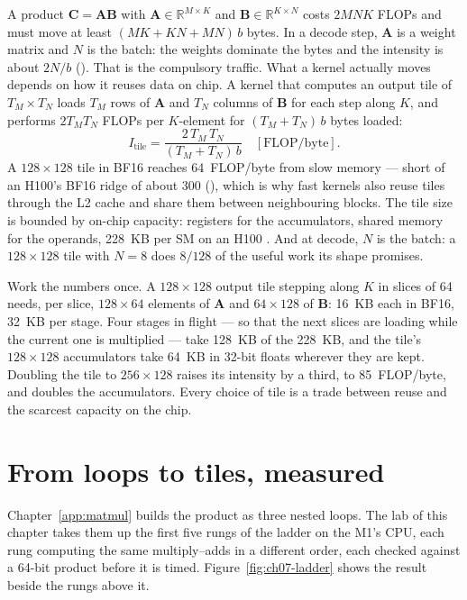 A product $\mathbf{C}=\mathbf{A}\mathbf{B}$ with
$\mathbf{A}\in\mathbb{R}^{M\times K}$ and $\mathbf{B}\in\mathbb{R}^{K\times N}$
costs $2MNK$ FLOPs and must move at least $(MK+KN+MN)\,b$ bytes. In a decode
step, $\mathbf{A}$ is a weight matrix and $N$ is the batch: the weights
dominate the bytes and the intensity is about $2N/b$ (). That is
the compulsory traffic. What a kernel actually moves depends on how it reuses
data on chip. A kernel that computes an output tile of $T_M\times T_N$ loads
$T_M$ rows of $\mathbf{A}$ and $T_N$ columns of $\mathbf{B}$ for each step
along $K$, and performs $2T_MT_N$ FLOPs per $K$-element for
$(T_M+T_N)\,b$ bytes loaded:
\begin{equation}
I_{\text{tile}} = \frac{2\,T_M\,T_N}{(T_M+T_N)\,b}\quad[\text{FLOP/byte}].
\label{eq:tile-intensity}
\end{equation}
A $128\times128$ tile in BF16 reaches 64~FLOP/byte from slow memory --- short
of an H100's BF16 ridge of about 300 (), which is why fast
kernels also reuse tiles through the L2 cache and share them between
neighbouring blocks. The tile size is bounded by on-chip capacity: registers
for the accumulators, shared memory for the operands, 228~KB per SM on an H100
\cite{nvidia2026hoppertuning}. And at decode, $N$ is the batch: a
$128\times128$ tile with $N=8$ does $8/128$ of the useful work its shape
promises.

Work the numbers once. A $128 \times 128$ output tile stepping along $K$ in
slices of 64 needs, per slice, $128 \times 64$ elements of $\mathbf{A}$ and
$64 \times 128$ of $\mathbf{B}$: 16~KB each in BF16, 32~KB per stage. Four stages
in flight --- so that the next slices are loading while the current one is
multiplied --- take 128~KB of the 228~KB, and the tile's $128 \times 128$
accumulators take 64~KB in 32-bit floats wherever they are kept. Doubling the
tile to $256 \times 128$ raises its intensity by a third, to 85~FLOP/byte, and
doubles the accumulators. Every choice of tile is a trade between reuse and
the scarcest capacity on the chip.

\section{From loops to tiles, measured}

Chapter~\ref{app:matmul} builds the product as three nested loops. The lab of
this chapter takes them up the first five rungs of the ladder on the M1's CPU,
each rung computing the same multiply--adds in a different order, each checked
against a 64-bit product before it is timed. Figure~\ref{fig:ch07-ladder}
shows the result beside the rungs above it.

